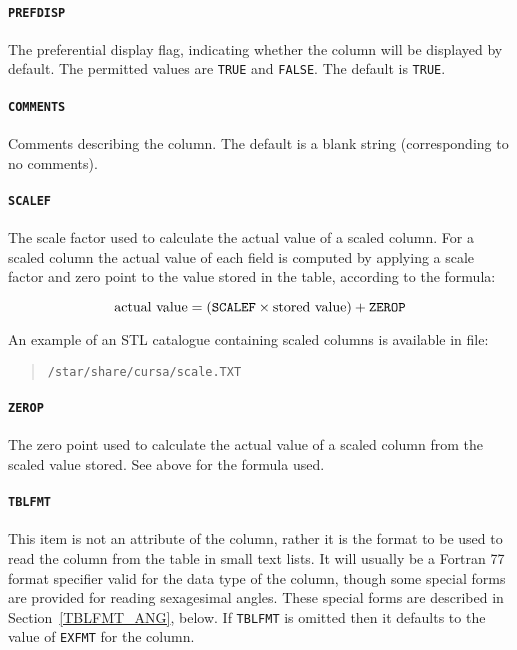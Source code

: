 \documentclass[twoside,11pt]{article}
\renewcommand{\_}{\texttt{\symbol{95}}}
\begin{document}
\paragraph{{\tt PREFDISP}}  The preferential display flag, indicating
whether the column will be displayed by default.
The permitted values are {\tt TRUE} and {\tt FALSE}.
The default is {\tt TRUE}.

\paragraph{{\tt COMMENTS}}  Comments describing the column.  The default
is a blank string (corresponding to no comments).

\paragraph{{\tt SCALEF}} The scale factor used to calculate the actual
value of a scaled column.  For a scaled column the actual value of each
field is computed by applying a scale factor and zero point to the value
stored in the table, according to the formula:

\begin{equation}
{\rm actual~value} =
                ( {\tt SCALEF} \times {\rm stored~value} ) + {\tt ZEROP}
\end{equation}

An example of an STL catalogue containing scaled columns is available in
file:

\begin{verse}
{\tt /star/share/cursa/scale.TXT}
\end{verse}

\paragraph{{\tt ZEROP}} The zero point used to calculate the actual value
of a scaled column from the scaled value stored. See above for the
formula used.

\paragraph{{\tt TBLFMT}} This item is not an attribute of the column,
rather it is the format to be used to read the column from the table
in small text lists.  It will usually be a Fortran 77 format specifier
valid for the data type of the column, though some special forms are
provided for reading sexagesimal angles.  These special forms are
described in Section~\ref{TBLFMT_ANG}, below.  If {\tt TBLFMT} is
omitted then it defaults to the value of {\tt EXFMT} for the column.
\end{document}
